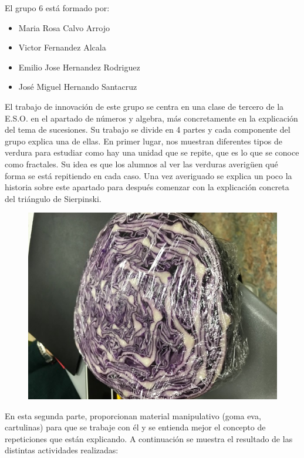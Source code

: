 El grupo 6 está formado por:

\begin{itemize}

\item Maria Rosa Calvo Arrojo 

\item Victor Fernandez Alcala 

\item Emilio Jose Hernandez Rodriguez 

\item José Miguel Hernando Santacruz 
\end{itemize}

El trabajo de innovación de este grupo se centra en una clase de tercero de la E.S.O. en el apartado de números y algebra, más concretamente en la explicación del tema de sucesiones. Su trabajo se divide en 4 partes y cada componente del grupo explica una de ellas. En primer lugar, nos muestran diferentes tipos de verdura para estudiar como hay una unidad que se repite, que es lo que se conoce como fractales. Su idea es que los alumnos al ver las verduras averigüen qué forma se está repitiendo en cada caso. Una vez averiguado se explica un poco la historia sobre este apartado para después comenzar con la explicación concreta del triángulo de Sierpinski.


\begin{figure}[hbtp]
\centering
\includegraphics[scale=1.2]{img/grupo6_1.jpg}
\end{figure}


En esta segunda parte, proporcionan material manipulativo (goma eva, cartulinas) para que se trabaje con él y se entienda mejor el concepto de repeticiones que están explicando. A continuación se muestra el resultado de las distintas actividades realizadas:



